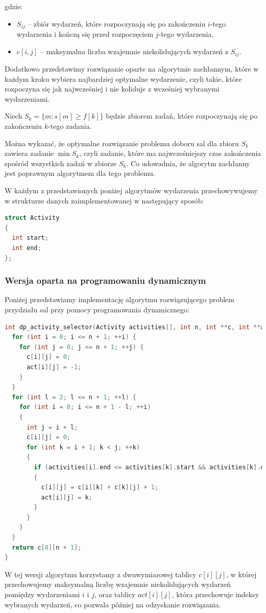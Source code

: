 \documentclass{article}
\begin{document}
gdzie:
\begin{itemize}
    \item $ S_{ij} $ – zbiór wydarzeń, które rozpoczynają się po zakończeniu $i$-tego wydarzenia i kończą się przed rozpoczęciem $j$-tego wydarzenia,
    \item $c[i,j]$ – maksymalna liczba wzajemnie niekolidujących wydarzeń z $S_{ij}$.
\end{itemize}

Dodatkowo przedstawimy rozwiązanie oparte na algorytmie zachłannym, które w każdym kroku wybiera najbardziej optymalne wydarzenie, czyli takie, które rozpoczyna się jak najwcześniej i nie koliduje z wcześniej wybranymi wydarzeniami. 

Niech $S_k = \{ m : s[m] \geq f[k] \}$ będzie zbiorem zadań, które rozpoczynają się po zakończeniu $k$-tego zadania.

Można wykazać, że optymalne rozwiązanie problemu doboru sal dla zbioru $S_k$ zawiera zadanie $\min S_k$, czyli zadanie, które ma najwcześniejszy czas zakończenia spośród wszystkich zadań w zbiorze $S_k$. Co udowadnia, że algorytm zachłanny jest poprawnym algorytmem dla tego problemu.

W każdym z przedstawionych poniżej algorytmów wydarzenia przechowywujemy w strukturze danych zaimplementowanej w następujący sposób:
\begin{lstlisting}[style=mystyle, language=C++, caption={Implementacja \texttt{activity}}, label={lst:activity}]
struct Activity
{
  int start;
  int end;
};
\end{lstlisting}

\subsubsection{Wersja oparta na programowaniu dynamicznym}
Poniżej przedstawiamy implementację algorytmu rozwiązującego problem przydziału sal przy pomocy programowania dynamicznego:
\begin{lstlisting}[style=mystyle, language=C++, caption={Implementacja \texttt{dp\_activity\_selector}}, label={lst:dp_activity_selector}]
int dp_activity_selector(Activity activities[], int n, int **c, int **act) {
  for (int i = 0; i <= n + 1; ++i) {
    for (int j = 0; j <= n + 1; ++j) {
      c[i][j] = 0;
      act[i][j] = -1;
    }
  }
  for (int l = 2; l <= n + 1; ++l) {
    for (int i = 0; i <= n + 1 - l; ++i)
    {
      int j = i + l;
      c[i][j] = 0;
      for (int k = i + 1; k < j; ++k)
      {
        if (activities[i].end <= activities[k].start && activities[k].end <= activities[j].start && c[i][k] + c[k][j] + 1 > c[i][j])
        {
          c[i][j] = c[i][k] + c[k][j] + 1;
          act[i][j] = k;
        }
      }
    }
  }
  return c[0][n + 1];
}
\end{lstlisting}
W tej wersji algorytmu korzystamy z dwuwymiarowej tablicy $c[i][j]$, w której przechowujemy maksymalną liczbę wzajemnie niekolidujących wydarzeń pomiędzy wydarzeniami $i$ i $j$, oraz tablicy $act[i][j]$, która przechowuje indeksy wybranych wydarzeń, co pozwala później na odzyskanie rozwiązania. 
\end{document}
